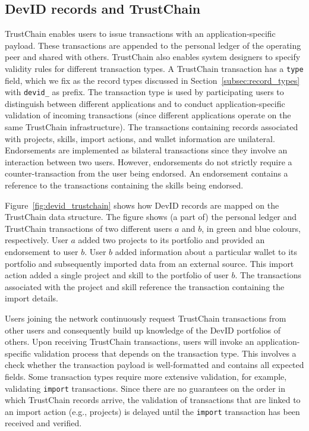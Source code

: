 \subsection{DevID records and TrustChain}
\label{subsec:devid_record_specs}
TrustChain enables users to issue transactions with an application-specific payload.
These transactions are appended to the personal ledger of the operating peer and shared with others.
TrustChain also enables system designers to specify validity rules for different transaction types.
A TrustChain transaction has a \texttt{type} field, which we fix as the record types discussed in Section~\ref{subsec:record_types} with \texttt{devid\_} as prefix.
The transaction type is used by participating users to distinguish between different applications and to conduct application-specific validation of incoming transactions (since different applications operate on the same TrustChain infrastructure).
The transactions containing records associated with projects, skills, import actions, and wallet information are unilateral.
Endorsements are implemented as bilateral transactions since they involve an interaction between two users.
However, endorsements do not strictly require a counter-transaction from the user being endorsed.
An endorsement contains a reference to the transactions containing the skills being endorsed.

Figure~\ref{fig:devid_trustchain} shows how DevID records are mapped on the TrustChain data structure.
The figure shows (a part of) the personal ledger and TrustChain transactions of two different users $ a $ and $ b $, in green and blue colours, respectively.
User $ a $ added two projects to its portfolio and provided an endorsement to user $ b $.
User $ b $ added information about a particular wallet to its portfolio and subsequently imported data from an external source.
This import action added a single project and skill to the portfolio of user $ b $.
The transactions associated with the project and skill reference the transaction containing the import details.

Users joining the network continuously request TrustChain transactions from other users and consequently build up knowledge of the DevID portfolios of others.
Upon receiving TrustChain transactions, users will invoke an application-specific validation process that depends on the transaction type.
This involves a check whether the transaction payload is well-formatted and contains all expected fields.
Some transaction types require more extensive validation, for example, validating \texttt{import} transactions.
Since there are no guarantees on the order in which TrustChain records arrive, the validation of transactions that are linked to an import action (e.g., projects) is delayed until the \texttt{import} transaction has been received and verified.

